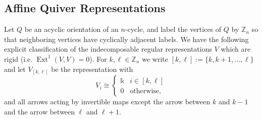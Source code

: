 \documentclass[12pt]{amsart}
\newcommand{\ZZ}{\mathbb{Z}}
\newcommand{\kk}{\Bbbk}%
\newcommand{\rep}{\operatorname{rep}}
\DeclareMathOperator{\Ext}{Ext}
\newtheorem{proposition}[theorem]{Proposition}
\theoremstyle{remark}
\numberwithin{equation}{section}
\numberwithin{figure}{section}
\begin{document}
\subsection{Affine Quiver Representations}\label{sec:rigidregular}
Let $Q$ be an acyclic orientation of an $n$-cycle, and label the vertices of $Q$ by $\ZZ_n$ so that neighboring vertices have cyclically adjacent labels. %
We have the following explicit classification of the indecomposable regular representations $V$ which are rigid (i.e. $\Ext^1(V,V)=0$). For $k,\ell\in\ZZ_n$ we write $[k,\ell]:=\{k,k+1,\ldots,\ell\}$ and let $V_{[k,\ell]}$ be the representation with 
\[
V_i \cong \begin{cases} \kk & i \in [k,\ell] \\ 0 & \text{otherwise,} \end{cases}
\]
and all arrows acting by invertible maps except the arrow between $k$ and $k-1$ and the arrow between $\ell$ and $\ell + 1$. 
\end{document}
